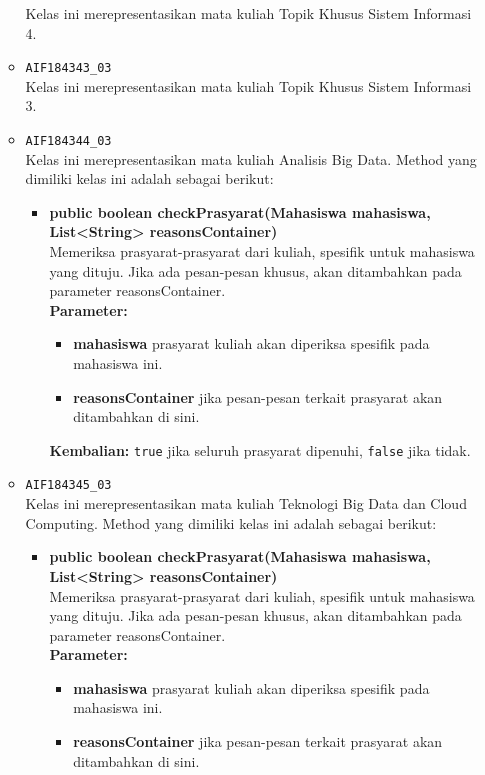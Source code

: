 \begin{enumerate}
\begin{itemize}
		Kelas ini merepresentasikan mata kuliah Topik Khusus Sistem Informasi 4.
		\item \texttt{AIF184343\_03} \\
		Kelas ini merepresentasikan mata kuliah Topik Khusus Sistem Informasi 3.
		\item \texttt{AIF184344\_03} \\
		Kelas ini merepresentasikan mata kuliah Analisis Big Data. Method yang dimiliki kelas ini adalah sebagai berikut: 
		\begin{itemize}
			\item \textbf{public boolean checkPrasyarat(Mahasiswa mahasiswa, List<String> reasonsContainer)}\\
			Memeriksa prasyarat-prasyarat dari kuliah, spesifik untuk mahasiswa yang dituju. Jika ada pesan-pesan khusus, akan ditambahkan pada parameter reasonsContainer.\\
			\textbf{Parameter:}
			\begin{itemize}
				\item \textbf{mahasiswa} prasyarat kuliah akan diperiksa spesifik pada mahasiswa ini.
				\item \textbf{reasonsContainer} jika pesan-pesan terkait prasyarat akan ditambahkan di sini.
			\end{itemize}
			\textbf{Kembalian:} \texttt{true} jika seluruh prasyarat dipenuhi, \texttt{false} jika tidak.
		\end{itemize}
		\item \texttt{AIF184345\_03} \\
		Kelas ini merepresentasikan mata kuliah Teknologi Big Data dan Cloud Computing. Method yang dimiliki kelas ini adalah sebagai berikut: 
		\begin{itemize}
			\item \textbf{public boolean checkPrasyarat(Mahasiswa mahasiswa, List<String> reasonsContainer)}\\
			Memeriksa prasyarat-prasyarat dari kuliah, spesifik untuk mahasiswa yang dituju. Jika ada pesan-pesan khusus, akan ditambahkan pada parameter reasonsContainer.\\
			\textbf{Parameter:}
			\begin{itemize}
				\item \textbf{mahasiswa} prasyarat kuliah akan diperiksa spesifik pada mahasiswa ini.
				\item \textbf{reasonsContainer} jika pesan-pesan terkait prasyarat akan ditambahkan di sini.
			\end{itemize}

\end{itemize}
\end{itemize}
\end{enumerate}
